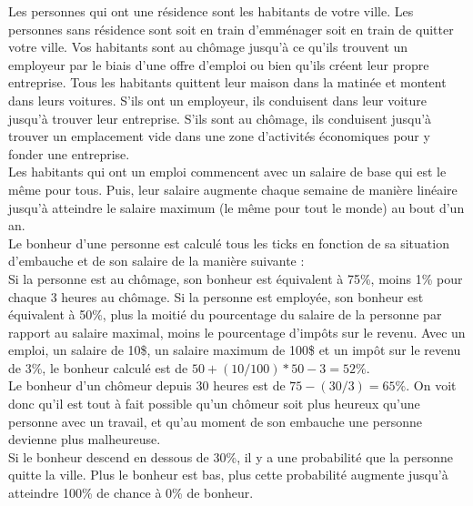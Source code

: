 \documentclass[11pt]{report}
\begin{document}
Les personnes qui ont une résidence sont les habitants de votre ville. Les personnes sans résidence sont soit en train d'emménager soit en train de quitter votre ville.
Vos habitants sont au chômage jusqu'à ce qu'ils trouvent un employeur par le biais d'une offre d'emploi ou bien qu'ils créent leur propre entreprise.
Tous les habitants quittent leur maison dans la matinée et montent dans leurs voitures. S'ils ont un employeur, ils conduisent dans leur voiture jusqu'à trouver leur entreprise. S'ils sont au chômage, ils conduisent jusqu'à trouver un emplacement vide dans une zone d'activités économiques pour y fonder une entreprise.\\
Les habitants qui ont un emploi commencent avec un salaire de base qui est le même pour tous. Puis, leur salaire augmente chaque semaine de manière linéaire jusqu'à atteindre le salaire maximum (le même pour tout le monde) au bout d'un an.\\
Le bonheur d'une personne est calculé tous les ticks en fonction de sa situation d'embauche et de son salaire de la manière suivante :\\
Si la personne est au chômage, son bonheur est équivalent à 75\%, moins 1\% pour chaque 3 heures au chômage.
Si la personne est employée, son bonheur est équivalent à 50\%, plus la moitié du pourcentage du salaire de la personne par rapport au salaire maximal, moins le pourcentage d'impôts sur le revenu.
Avec un emploi, un salaire de 10\$, un salaire maximum de 100\$ et un impôt sur le revenu de 3\%, le bonheur calculé est de $50 + (10 / 100) * 50 - 3 = 52\%$.\\
Le bonheur d'un chômeur depuis 30 heures est de $75 - (30 / 3) = 65\%$.
On voit donc qu'il est tout à fait possible qu'un chômeur soit plus heureux qu'une personne avec un travail, et qu'au moment de son embauche une personne devienne plus malheureuse.\\
Si le bonheur descend en dessous de 30\%, il y a une probabilité que la personne quitte la ville. Plus le bonheur est bas, plus cette probabilité augmente jusqu'à atteindre 100\% de chance à 0\% de bonheur.



\newpage
\end{document}
